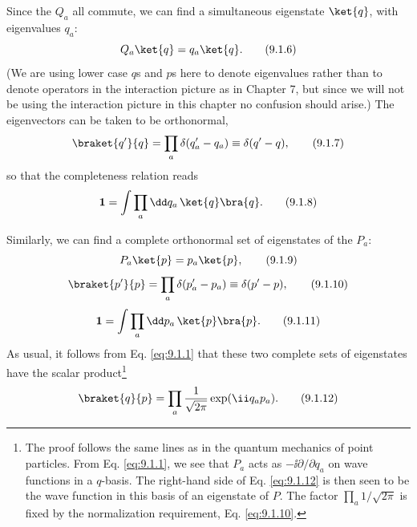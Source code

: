 Since the $Q_a$ all commute, we can find a simultaneous eigenstate
$\ket{q}$, with eigenvalues $q_a$:
\begin{equation}
  Q_a\ket{q}=q_a\ket{q}.
  \tag{9.1.6}\label{eq:9.1.6}
\end{equation}
(We are using lower case $q$s and $p$s here to denote eigenvalues rather
than to denote operators in the interaction picture as in Chapter 7, but
since we will not be using the interaction picture in this chapter no
confusion should arise.) The eigenvectors can be taken to be orthonormal,
\begin{equation}
  \braket{q'}{q}=\prod_a\delta(q'_a-q_a)\equiv\delta(q'-q),
  \tag{9.1.7}\label{eq:9.1.7}
\end{equation}
so that the completeness relation reads
\begin{equation}
  \mathbf{1}=\int\prod_a \dd q_a\,\ket{q}\bra{q}.
  \tag{9.1.8}\label{eq:9.1.8}
\end{equation}

Similarly, we can find a complete orthonormal set of eigenstates of the
$P_a$:
\begin{equation}
  P_a\ket{p}=p_a\ket{p},
  \tag{9.1.9}\label{eq:9.1.9}
\end{equation}
\begin{equation}
  \braket{p'}{p}=\prod_a\delta(p'_a-p_a)\equiv\delta(p'-p),
  \tag{9.1.10}\label{eq:9.1.10}
\end{equation}
\begin{equation}
  \mathbf{1}=\int\prod_a \dd p_a\,\ket{p}\bra{p}.
  \tag{9.1.11}\label{eq:9.1.11}
\end{equation}
As usual, it follows from Eq. \eqref{eq:9.1.1} that these two complete sets of
eigenstates have the scalar product\footnote{The proof follows the same lines
as in the quantum mechanics of point particles. From Eq. \eqref{eq:9.1.1}, we see
that $P_a$ acts as $-\ii\partial/\partial q_a$ on wave functions in a $q$-basis.
The right-hand side of Eq. \eqref{eq:9.1.12} is then seen to be the wave function in
this basis of an eigenstate of $P$. The factor $\prod_a1/\sqrt{2\pi}$ is fixed
by the normalization requirement, Eq. \eqref{eq:9.1.10}.}
\begin{equation}
  \braket{q}{p}=\prod_a\frac{1}{\sqrt{2\pi}}\exp(\ii q_ap_a).
  \tag{9.1.12}\label{eq:9.1.12}
\end{equation}


